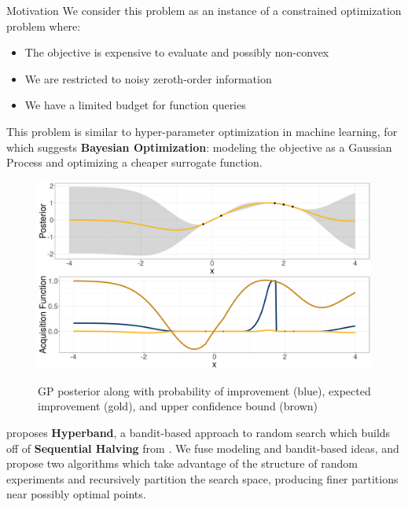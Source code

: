 \documentclass[final]{beamer}
\newlength{\onecolwid}
\begin{document}
\begin{frame}[t]
\begin{columns}[t]
\begin{column}{\onecolwid}
\begin{block}{Motivation}
 We consider this problem as an instance of a constrained optimization problem where:
\begin{itemize}
\item The objective is expensive to evaluate and possibly non-convex
\item We are restricted to noisy zeroth-order information
\item We have a limited budget for function queries
\end{itemize}
This problem is similar to hyper-parameter optimization in machine learning, for which  \cite{Snoek2012} suggests { \bf Bayesian Optimization}: modeling the objective as a Gaussian Process and optimizing a cheaper surrogate function.

\begin{figure}[H]
\includegraphics[width=\onecolwid]{acq_funcs.png}
\label{acq_funcs}
\caption{GP posterior along with probability of improvement (blue), expected improvement (gold), and upper confidence bound (brown)}
\end{figure}

\cite{Li2016} proposes {\bf Hyperband}, a bandit-based approach to random search which builds off of {\bf Sequential Halving} from \cite{Karnin2013,Jamieson2015}. We fuse modeling and bandit-based ideas, and propose two algorithms which take advantage of the structure of random experiments and recursively partition the search space, producing finer partitions near possibly optimal points.

\end{block}




\end{column} %


\end{columns}
\end{frame}
\end{document}
